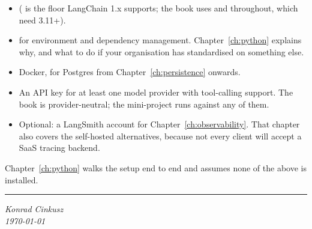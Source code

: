 \begin{itemize}[leftmargin=1.4em]
  \item \pyver{} (\pymin{} is the floor LangChain 1.x supports; the book uses
         and  throughout, which
        need 3.11+).
  \item {} for environment and dependency management.
        Chapter~\ref{ch:python} explains why, and what to do if your organisation
        has standardised on something else.
  \item Docker, for Postgres from Chapter~\ref{ch:persistence} onwards.
  \item An API key for at least one model provider with tool-calling support.
        The book is provider-neutral; the mini-project runs against any of them.
  \item Optional: a LangSmith account for Chapter~\ref{ch:observability}. That
        chapter also covers the self-hosted alternatives, because not every
        client will accept a SaaS tracing backend.
\end{itemize}

Chapter~\ref{ch:python} walks the setup end to end and assumes none of the above
is installed.

\vspace{1.5em}
\noindent\rule{\linewidth}{0.4pt}
\vspace{0.5em}

\noindent\emph{Konrad Cinkusz\\ \today}

\cleardoublepage
